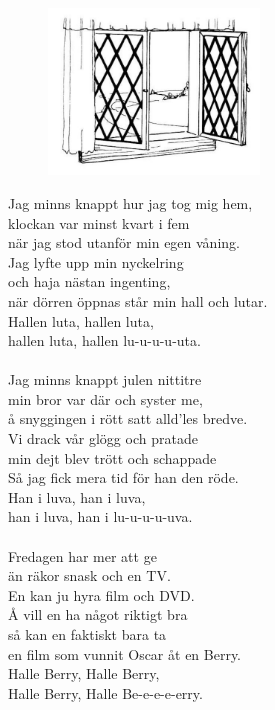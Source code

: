 \documentclass[a6paper, 10pt, twoside]{article}
\begin{document}
\vspace{25pt}
\begin{figure}[!h]
\center
\includegraphics[width=0.5\textwidth]{fonster.png}
\end{figure}

\begin{center}
\end{center}
\vspace{-2pt} %
\begin{lyrics} 
\small Jag minns knappt hur jag tog mig hem, \\
klockan var minst kvart i fem \\
när jag stod utanför min egen våning. \\
Jag lyfte upp min nyckelring \\
och haja nästan ingenting, \\
när dörren öppnas står min hall och lutar. \\
Hallen luta, hallen luta, \\
hallen luta, hallen lu-u-u-u-uta. \\
\vspace{5pt}\\
Jag minns knappt julen nittitre \\
min bror var där och syster me, \\
å snyggingen i rött satt alld'les bredve. \\
Vi drack vår glögg och pratade \\
min dejt blev trött och schappade \\
Så jag fick mera tid för han den röde. \\
Han i luva, han i luva, \\
han i luva, han i lu-u-u-u-uva. \\
\vspace{5pt}\\
Fredagen har mer att ge \\
än räkor snask och en TV. \\
En kan ju hyra film och DVD. \\
Å vill en ha något riktigt bra \\
så kan en faktiskt bara ta \\
en film som vunnit Oscar åt en Berry. \\
Halle Berry, Halle Berry, \\
Halle Berry, Halle Be-e-e-e-erry. \\
\end{lyrics}
\end{document}
